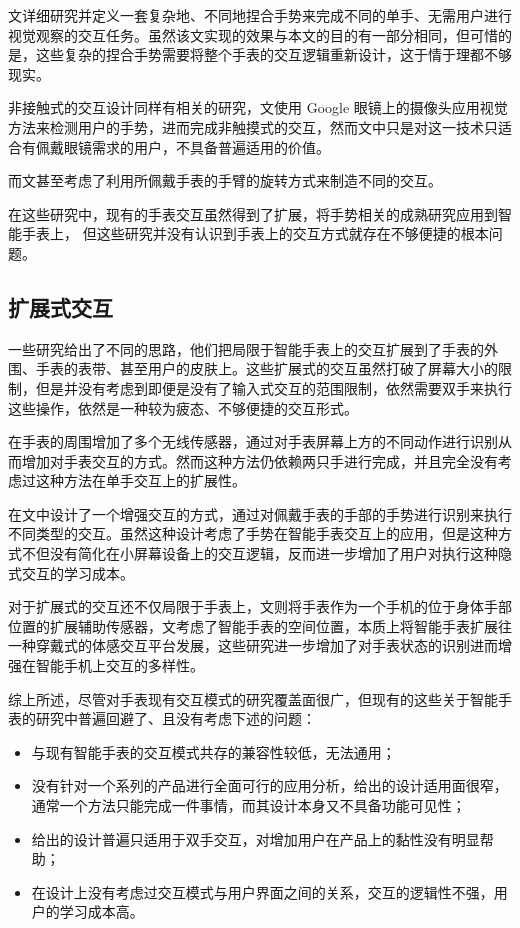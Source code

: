 文\cite{loclair2010pinchwatch}详细研究并定义一套复杂地、不同地捏合手势来完成不同的单手、无需用户进行视觉观察的交互任务。虽然该文实现的效果与本文的目的有一部分相同，但可惜的是，这些复杂的捏合手势需要将整个手表的交互逻辑重新设计，这于情于理都不够现实。

非接触式的交互设计同样有相关的研究，文\cite{lv2015extending}使用 Google 眼镜上的摄像头应用视觉方法来检测用户的手势，进而完成非触摸式的交互，然而文中只是对这一技术只适合有佩戴眼镜需求的用户，不具备普遍适用的价值。

而文\cite{Kerber:2015:WPM:2836041.2836063}甚至考虑了利用所佩戴手表的手臂的旋转方式来制造不同的交互。

在这些研究中，现有的手表交互虽然得到了扩展，将手势相关的成熟研究应用到智能手表上，
但这些研究并没有认识到手表上的交互方式就存在不够便捷的根本问题。

\subsection{扩展式交互}

一些研究给出了不同的思路，他们把局限于智能手表上的交互扩展到了手表的外围\cite{Knibbe:2014:EIS:2559206.2581315,Kratz:2009:HEA:1613858.1613912}、手表的表带\cite{Perrault:2013:WSG:2470654.2466192}、甚至用户的皮肤上\cite{Ogata:2015:SSG:2735711.2735830}。这些扩展式的交互虽然打破了屏幕大小的限制，但是并没有考虑到即便是没有了输入式交互的范围限制，依然需要双手来执行这些操作，依然是一种较为疲态、不够便捷的交互形式。

\cite{kim2007gesture}在手表的周围增加了多个无线传感器，通过对手表屏幕上方的不同动作进行识别从而增加对手表交互的方式。然而这种方法仍依赖两只手进行完成，并且完全没有考虑过这种方法在单手交互上的扩展性。

在文\cite{Yang:2015:EST:2815585.2815724}中设计了一个增强交互的方式，通过对佩戴手表的手部的手势进行识别来执行不同类型的交互。虽然这种设计考虑了手势在智能手表交互上的应用，但是这种方式不但没有简化在小屏幕设备上的交互逻辑，反而进一步增加了用户对执行这种隐式交互的学习成本。

对于扩展式的交互还不仅局限于手表上，文\cite{Chen:2014:DEJ:2556288.2556955}则将手表作为一个手机的位于身体手部位置的扩展辅助传感器，文\cite{Yang:2014:MIS:2638728.2638848}考虑了智能手表的空间位置，本质上将智能手表扩展往一种穿戴式的体感交互平台发展\cite{fuquanjun2015}，这些研究进一步增加了对手表状态的识别进而增强在智能手机上交互的多样性。

综上所述，尽管对手表现有交互模式的研究覆盖面很广，但现有的这些关于智能手表的研究中普遍回避了、且没有考虑下述的问题：
\begin{itemize}
    \kaishu
    \item 与现有智能手表的交互模式共存的兼容性较低，无法通用；
    \item 没有针对一个系列的产品进行全面可行的应用分析，给出的设计适用面很窄，通常一个方法只能完成一件事情，而其设计本身又不具备功能可见性；
    \item 给出的设计普遍只适用于双手交互，对增加用户在产品上的黏性没有明显帮助；
    \item 在设计上没有考虑过交互模式与用户界面之间的关系，交互的逻辑性不强，用户的学习成本高。
\end{itemize}

\cleardoublepage
